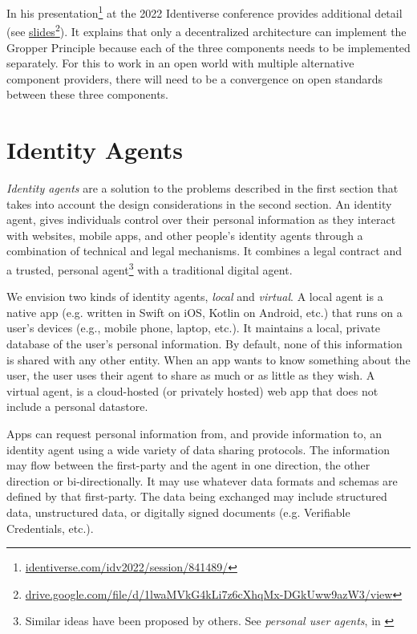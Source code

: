 \documentclass[11pt, oneside]{article}   	%
\newcommand{\hyperfootnote}[1][]{\def\ArgI{{#1}}\hyperfootnoteRelay}
\newcommand\hyperfootnoteRelay[2][]{\href{#1#2}{\ArgI}\footnote{\href{#1#2}{#2}}}
\begin{document}
In his presentation\hyperfootnote[][https://]{identiverse.com/idv2022/session/841489/} at the 2022 Identiverse conference provides additional detail (see \hyperfootnote[slides][https://]{drive.google.com/file/d/1lwaMVkG4kLi7z6cXhqMx-DGkUww9azW3/view}). It explains that only a decentralized architecture can implement the Gropper Principle because each of the three components needs to be implemented separately. For this to work in an open world with multiple alternative component providers, there will need to be a convergence on open standards between these three components. 

\section{Identity Agents} %

 \emph{Identity agents} are a solution to the problems described in the first section that takes into account the design considerations in the second section. An identity agent, gives individuals control over their personal information as they interact with websites, mobile apps, and other people's identity agents through a combination of technical and legal mechanisms. It combines a legal contract and a trusted, personal agent\footnote{Similar ideas have been proposed by others. See \emph{personal user agents}, in \cite[p24]{Flanagan2020}} with a traditional digital agent\cite{Graham2023}. 

We envision two kinds of identity agents, \emph{local} and \emph{virtual}. A local agent is a native app (e.g. written in Swift on iOS, Kotlin on Android, etc.) that runs on a user's devices (e.g., mobile phone, laptop, etc.). It maintains a local, private database of the user's personal information. By default, none of this information is shared with any other entity. When an app wants to know something about the user, the user uses their agent to share as much or as little as they wish. A virtual agent, is a cloud-hosted (or privately hosted) web app that does not include a personal datastore. 

Apps can request personal information from, and provide information to, an identity agent using a wide variety of data sharing protocols. The information may flow between the first-party and the agent in one direction, the other direction or bi-directionally. It may use whatever data formats and schemas are defined by that first-party. The data being exchanged may include structured data, unstructured data, or digitally signed documents (e.g. Verifiable Credentials, etc.). 

\end{document}
